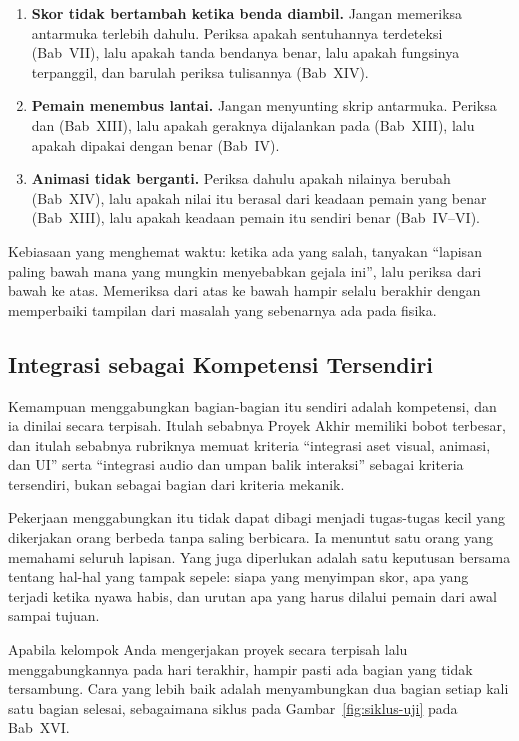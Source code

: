 \begin{enumerate}
  \item \textbf{Skor tidak bertambah ketika benda diambil.} Jangan memeriksa
        antarmuka terlebih dahulu. Periksa apakah sentuhannya terdeteksi
        (Bab~VII), lalu apakah tanda bendanya benar, lalu apakah fungsinya
        terpanggil, dan barulah periksa tulisannya (Bab~XIV).
  \item \textbf{Pemain menembus lantai.} Jangan menyunting skrip antarmuka.
        Periksa  dan  (Bab~XIII), lalu
        apakah geraknya dijalankan pada  (Bab~XIII), lalu
        apakah  dipakai dengan benar (Bab~IV).
  \item \textbf{Animasi tidak berganti.} Periksa dahulu apakah nilainya
        berubah (Bab~XIV), lalu apakah nilai itu berasal dari keadaan pemain
        yang benar (Bab~XIII), lalu apakah keadaan pemain itu sendiri benar
        (Bab~IV--VI).
\end{enumerate}

\begin{tipsbox}
Kebiasaan yang menghemat waktu: ketika ada yang salah, tanyakan ``lapisan
paling bawah mana yang mungkin menyebabkan gejala ini'', lalu periksa dari
bawah ke atas. Memeriksa dari atas ke bawah hampir selalu berakhir dengan
memperbaiki tampilan dari masalah yang sebenarnya ada pada fisika.
\end{tipsbox}

\subsection{Integrasi sebagai Kompetensi Tersendiri}

Kemampuan menggabungkan bagian-bagian itu sendiri adalah kompetensi, dan ia
dinilai secara terpisah. Itulah sebabnya Proyek Akhir memiliki bobot terbesar,
dan itulah sebabnya rubriknya memuat kriteria ``integrasi aset visual,
animasi, dan UI'' serta ``integrasi audio dan umpan balik interaksi'' sebagai
kriteria tersendiri, bukan sebagai bagian dari kriteria mekanik.

Pekerjaan menggabungkan itu tidak dapat dibagi menjadi tugas-tugas kecil yang
dikerjakan orang berbeda tanpa saling berbicara. Ia menuntut satu orang yang
memahami seluruh lapisan. Yang juga diperlukan adalah satu keputusan bersama
tentang hal-hal yang tampak sepele: siapa yang menyimpan skor, apa yang terjadi
ketika
nyawa habis, dan urutan apa yang harus dilalui pemain dari awal sampai tujuan.

\begin{catatabox}
Apabila kelompok Anda mengerjakan proyek secara terpisah lalu menggabungkannya
pada hari terakhir, hampir pasti ada bagian yang tidak tersambung. Cara yang
lebih baik adalah menyambungkan dua bagian setiap kali satu bagian selesai,
sebagaimana siklus pada Gambar~\ref{fig:siklus-uji} pada Bab~XVI.
\end{catatabox}

